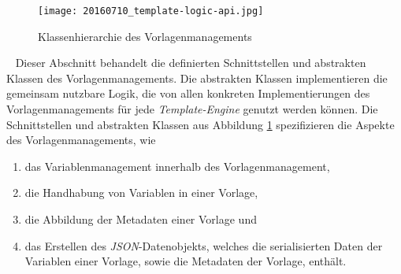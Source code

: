 \begin{figure}[h]
\centering
\texttt{[image: 20160710\_template-logic-api.jpg]} %
\caption{Klassenhierarchie des Vorlagenmanagements}
\label{fig:template-logic-api-hierarchy}
\end{figure}
\ \newline
Dieser Abschnitt behandelt die definierten Schnittstellen und abstrakten Klassen des Vorlagenmanagements. Die abstrakten Klassen implementieren die gemeinsam nutzbare Logik, die von allen konkreten Implementierungen des Vorlagenmanagements für jede \emph{Template-Engine} genutzt werden können. Die Schnittstellen und abstrakten Klassen aus Abbildung \ref{fig:template-logic-api-hierarchy}  spezifizieren die Aspekte des Vorlagenmanagements, wie
\begin{enumerate}
	\item das Variablenmanagement innerhalb des Vorlagenmanagement,
	\item die Handhabung von Variablen in einer Vorlage,
	\item die Abbildung der Metadaten einer Vorlage und 
	\item das Erstellen des \emph{JSON}-Datenobjekts, welches die serialisierten Daten der Variablen einer Vorlage, sowie die Metadaten der Vorlage, enthält.
\end{enumerate}

